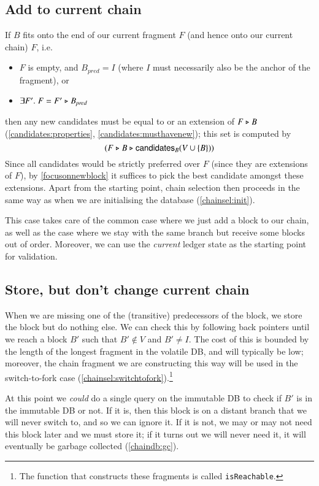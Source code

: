 \subsection{Add to current chain}
\label{chainsel:addtochain}

If $B$ fits onto the end of our current fragment $F$ (and hence onto our current chain) $F$, i.e.
%
\begin{itemize}
\item $F$ is empty, and $B_\mathit{pred} = I$
(where $I$ must necessarily also be the anchor of the fragment), or
\item $\exists F' .\; F = F' \mathrel{\triangleright} B_\mathit{pred}$
\end{itemize}
%
then any new candidates must be equal to or an extension of $F \mathrel{\triangleright} B$
(\cref{candidates:properties}, \cref{candidates:musthavenew}); this set is
computed by
%
\begin{equation*}
(F \mathrel{\triangleright} B \mathrel{\triangleright} \mathsf{candidates}_B(V \cup \{B\}))
\end{equation*}
%
Since all candidates would be strictly preferred over $F$ (since they are
extensions of $F$), by \cref{focusonnewblock} it suffices to pick the best
candidate amongst these extensions. Apart from the starting point, chain
selection then proceeds in the same way as when we are initialising the database
(\cref{chainsel:init}).

This case takes care of the common case where we just add a block to our chain,
as well as the case where we stay with the same branch but receive some blocks
out of order. Moreover, we can use the \emph{current} ledger state as the
starting point for validation.

\subsection{Store, but don't change current chain}

When we are missing one of the (transitive) predecessors of the block, we store
the block but do nothing else. We can check this by following back pointers
until we reach a block $B'$ such that $B' \notin V$ and $B' \neq I$. The cost of
this is bounded by the length of the longest fragment in the volatile DB, and
will typically be low; moreover, the chain fragment we are constructing this way
will be used in the switch-to-fork case
(\cref{chainsel:switchtofork}).\footnote{The function that constructs these
fragments is called \lstinline!isReachable!.}

At this point we \emph{could} do a single query on the immutable DB to check if
$B'$ is in the immutable DB or not. If it is, then this block is on a distant
branch that we will never switch to, and so we can ignore it. If it is not, we
may or may not need this block later and we must store it; if it turns out we
will never need it, it will eventually be garbage collected (\cref{chaindb:gc}).

